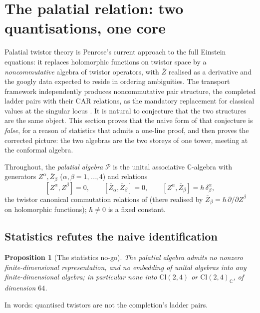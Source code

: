 \documentclass[11pt]{article}
\newtheorem{proposition}[theorem]{Proposition}
\theoremstyle{definition}
\newcommand{\Cl}{\mathrm{Cl}}
\newcommand{\C}{\mathbb{C}}
\begin{document}
\section{The palatial relation: two quantisations, one core}\label{sec:palatial}

Palatial twistor theory \cite{Penrose15} is Penrose's current approach to the full Einstein equations: it replaces holomorphic functions on twistor space by a \emph{noncommutative} algebra of twistor operators, with $\bar Z$ realised as a derivative and the googly data expected to reside in ordering ambiguities. The transport framework independently produces noncommutative pair structure, the completed ladder pairs with their CAR relations, as the mandatory replacement for classical values at the singular locus \cite{ButlerT1}. It is natural to conjecture that the two structures are the same object. This section proves that the naive form of that conjecture is \emph{false}, for a reason of statistics that admits a one-line proof, and then proves the corrected picture: the two algebras are the two storeys of one tower, meeting at the conformal algebra.

Throughout, the \emph{palatial algebra} $\mathcal{P}$ is the unital associative $\C$-algebra with generators $Z^\alpha, \bar Z_\beta$ ($\alpha, \beta = 1, \dots, 4$) and relations
\[
[Z^\alpha, Z^\beta] = 0, \qquad [\bar Z_\alpha, \bar Z_\beta] = 0, \qquad [Z^\alpha, \bar Z_\beta] = \hbar\,\delta^\alpha_\beta ,
\]
the twistor canonical commutation relations of \cite{Penrose15} (there realised by $\bar Z_\beta = \hbar\,\partial/\partial Z^\beta$ on holomorphic functions); $\hbar \neq 0$ is a fixed constant.

\subsection{Statistics refutes the naive identification}\label{subsec:statistics}

\begin{proposition}[The statistics no-go]\label{prop:statistics}
The palatial algebra admits no nonzero finite-dimensional representation, and no embedding of unital algebras into any finite-dimensional algebra; in particular none into $\Cl(2,4)$ or $\Cl(2,4)_\C$, of dimension $64$.
\end{proposition}

In words: quantised twistors are not the completion's ladder pairs.
\end{document}
